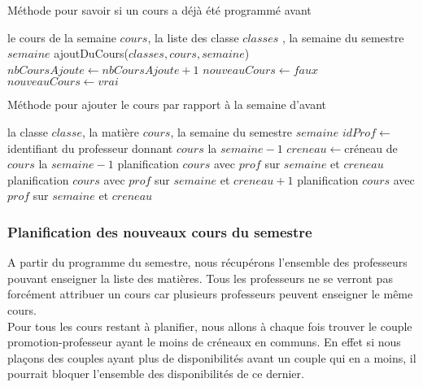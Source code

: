 \begin{algorithm}
\caption{Méthode pour savoir si un cours a déjà été programmé avant}
\begin{algorithmic}
\REQUIRE le cours de la semaine $cours$, la liste des classe $classes$ , la semaine du semestre $semaine$
\STATE ajoutDuCours($classes, cours, semaine$)
\STATE $nbCoursAjoute \leftarrow nbCoursAjoute + 1$
\ENDIF
\ENDFOR
{}
\STATE $nouveauCours \leftarrow faux$
\ELSE
\STATE $nouveauCours \leftarrow vrai$ 
\ENDIF
\end{algorithmic}
\end{algorithm}


\begin{algorithm}
\caption{Méthode pour ajouter le cours par rapport à la semaine d'avant}
\begin{algorithmic}
\REQUIRE la classe $classe$, la matière $cours$, la semaine du semestre $semaine$
\STATE $idProf \leftarrow $identifiant du professeur donnant $cours$ la $semaine - 1$
\STATE $creneau \leftarrow $créneau de $cours$ la $semaine - 1$
\STATE planification $cours$ avec $prof$ sur $semaine$ et $creneau$
\STATE planification $cours$ avec $prof$ sur $semaine$ et $creneau +1$
\ENDIF
\ELSE
{}
\STATE planification $cours$ avec $prof$ sur $semaine$ et $creneau$
\ENDIF
\ENDIF
\end{algorithmic}
\end{algorithm}

\newpage

\subsubsection{Planification des nouveaux cours du semestre}

A partir du programme du semestre, nous récupérons l'ensemble des professeurs pouvant enseigner la liste des matières. Tous les professeurs ne se verront pas forcément attribuer un cours car plusieurs professeurs peuvent enseigner le même cours.\\

Pour tous les cours restant à planifier, nous allons à chaque fois trouver le couple promotion-professeur ayant le moins de créneaux en communs. En effet si nous plaçons des couples ayant plus de disponibilités avant un couple qui en a moins, il pourrait bloquer l'ensemble des disponibilités de ce dernier.\\

